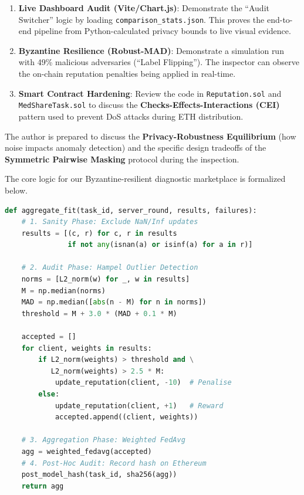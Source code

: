 \documentclass[10pt, a4paper, twocolumn]{article}
\begin{document}
\begin{enumerate}
    \item \textbf{Live Dashboard Audit (Vite/Chart.js)}: Demonstrate the ``Audit Switcher'' logic by loading \texttt{comparison\_stats.json}. This proves the end-to-end pipeline from Python-calculated privacy bounds to live visual evidence.
    \item \textbf{Byzantine Resilience (Robust-MAD)}: Demonstrate a simulation run with 49\% malicious adversaries (``Label Flipping''). The inspector can observe the on-chain reputation penalties being applied in real-time.
    \item \textbf{Smart Contract Hardening}: Review the code in \texttt{Reputation.sol} and \texttt{MedShareTask.sol} to discuss the \textbf{Checks-Effects-Interactions (CEI)} pattern used to prevent DoS attacks during ETH distribution.
\end{enumerate}

The author is prepared to discuss the \textbf{Privacy-Robustness Equilibrium} (how noise impacts anomaly detection) and the specific design tradeoffs of the \textbf{Symmetric Pairwise Masking} protocol during the inspection.

The core logic for our Byzantine-resilient diagnostic marketplace is formalized below.

\begin{lstlisting}[language=Python, caption={MedShare-FL Aggregation Algorithm}]
def aggregate_fit(task_id, server_round, results, failures):
    # 1. Sanity Phase: Exclude NaN/Inf updates
    results = [(c, r) for c, r in results
               if not any(isnan(a) or isinf(a) for a in r)]
    
    # 2. Audit Phase: Hampel Outlier Detection
    norms = [L2_norm(w) for _, w in results]
    M = np.median(norms)
    MAD = np.median([abs(n - M) for n in norms])
    threshold = M + 3.0 * (MAD + 0.1 * M)
    
    accepted = []
    for client, weights in results:
        if L2_norm(weights) > threshold and \
           L2_norm(weights) > 2.5 * M:
            update_reputation(client, -10)  # Penalise
        else:
            update_reputation(client, +1)   # Reward
            accepted.append((client, weights))
    
    # 3. Aggregation Phase: Weighted FedAvg
    agg = weighted_fedavg(accepted)
    # 4. Post-Hoc Audit: Record hash on Ethereum
    post_model_hash(task_id, sha256(agg))
    return agg
\end{lstlisting}
\end{document}
